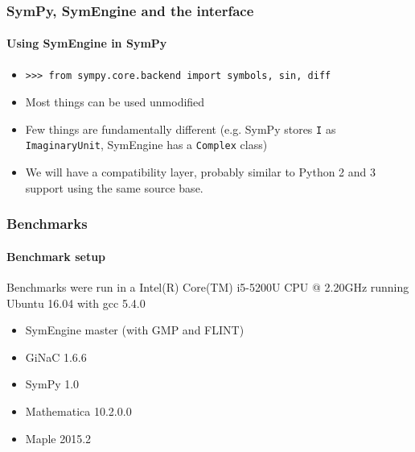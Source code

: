\documentclass{beamer}
\begin{document}
\begin{frame}[fragile]
\frametitle{SymPy, SymEngine and the interface}
\framesubtitle{Using SymEngine in SymPy}
\begin{itemize}
\item
\begin{verbatim}
>>> from sympy.core.backend import symbols, sin, diff
\end{verbatim}
\item Most things can be used unmodified
\item Few things are fundamentally different (e.g. SymPy stores \texttt{I} as
    \texttt{ImaginaryUnit}, SymEngine has a \texttt{Complex} class)
\item We will have a compatibility layer, probably similar to Python 2 and 3
    support using the same source base.
\end{itemize}
\end{frame}




\begin{frame}
\frametitle{Benchmarks}
\framesubtitle{Benchmark setup}
Benchmarks were run in a Intel(R) Core(TM) i5-5200U CPU @ 2.20GHz running Ubuntu 16.04 with gcc 5.4.0
\begin{itemize}
 \item SymEngine master (with GMP and FLINT)
 \item GiNaC 1.6.6
 \item SymPy 1.0
 \item Mathematica 10.2.0.0
 \item Maple 2015.2
\end{itemize}
\end{frame}




\end{document}
